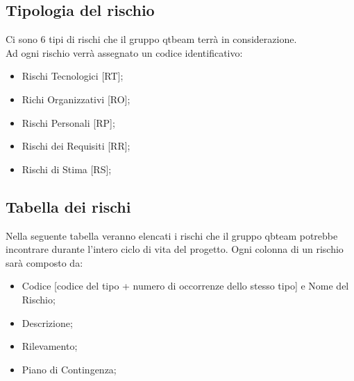 \subsection{Tipologia del rischio}
Ci sono 6 tipi di rischi che il gruppo qtbeam terrà in considerazione. 
\\Ad ogni rischio verrà assegnato un codice identificativo:
\begin{itemize}
	\item Rischi Tecnologici [RT];
	\item Richi Organizzativi [RO];
	\item Rischi Personali [RP];
	\item Rischi dei Requisiti [RR];
	\item Rischi di Stima [RS];
\end{itemize}

\subsection{Tabella dei rischi}
Nella seguente tabella veranno elencati i rischi che il gruppo qbteam potrebbe incontrare durante l'intero ciclo di vita del progetto.
Ogni colonna di un rischio sarà composto da:
\begin{itemize}
	\item Codice [codice del tipo + numero di occorrenze dello stesso tipo] e Nome del Rischio;
	\item Descrizione;
	\item Rilevamento;
	\item Piano di Contingenza;
\end{itemize}


